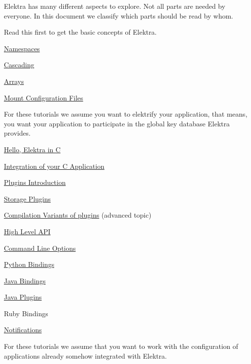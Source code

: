 Elektra has many different aspects to explore. Not all parts are needed by everyone. In this document we classify which parts should be read by whom.

Read this first to get the basic concepts of Elektra.


\begin{DoxyItemize}
\item \hyperlink{doc_tutorials_namespaces_md}{Namespaces}
\item \hyperlink{doc_tutorials_cascading_md}{Cascading}
\item \hyperlink{doc_tutorials_arrays_md}{Arrays}
\item \hyperlink{doc_tutorials_mount_md}{Mount Configuration Files}
\end{DoxyItemize}

For these tutorials we assume you want to elektrify your application, that means, you want your application to participate in the global key database Elektra provides.


\begin{DoxyItemize}
\item \hyperlink{doc_tutorials_hello-elektra_md}{Hello, Elektra in C}
\item \hyperlink{doc_tutorials_application-integration_md}{Integration of your C Application}
\item \hyperlink{doc_tutorials_plugins_md}{Plugins Introduction}
\item \hyperlink{doc_tutorials_storage-plugins_md}{Storage Plugins}
\item \hyperlink{doc_tutorials_compilation-variants_md}{Compilation Variants of plugins} (advanced topic)
\item \hyperlink{doc_tutorials_highlevel_md}{High Level A\+PI}
\item \hyperlink{doc_tutorials_command-line-options_md}{Command Line Options}
\item \hyperlink{doc_tutorials_python-kdb_md}{Python Bindings}
\item \hyperlink{doc_tutorials_java-kdb_md}{Java Bindings}
\item \hyperlink{doc_tutorials_java-plugins_md}{Java Plugins}
\item Ruby Bindings
\item \hyperlink{doc_tutorials_notifications_md}{Notifications}
\end{DoxyItemize}

For these tutorials we assume that you want to work with the configuration of applications already somehow integrated with Elektra.


